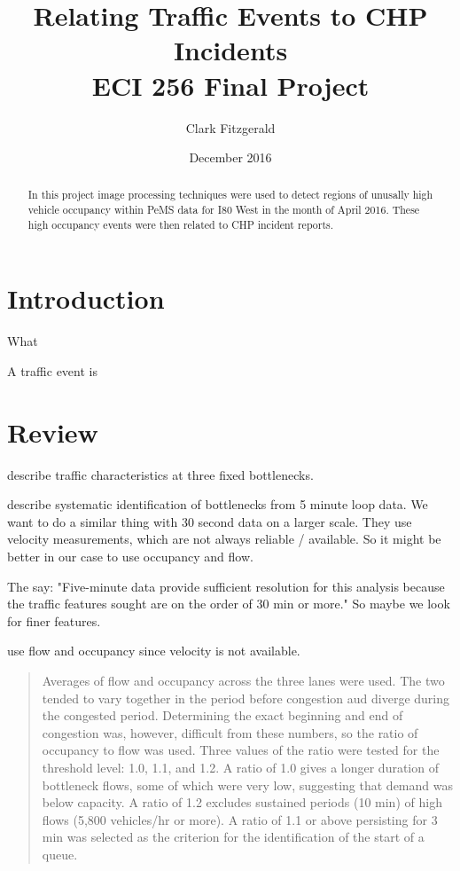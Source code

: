 \documentclass[12pt]{article}
\begin{document}
\title{Relating Traffic Events to CHP Incidents\\
ECI 256 Final Project}
\date{December 2016}
\author{Clark Fitzgerald}
\maketitle

\begin{abstract}

In this project image processing techniques were used to detect regions of
    unusally high vehicle occupancy 
within PeMS data for I80 West in the month of April 2016. 
These high occupancy events were then related to CHP incident reports.

\end{abstract}

\section{Introduction}

What 

A traffic event is 

\section{Review}

\cite{chung2007relation} describe traffic characteristics at three fixed bottlenecks.

\cite{chen2004systematic} describe systematic identification of bottlenecks from 5
minute loop data. We want to do a similar thing with 30 second data on a larger scale.
They use velocity measurements, which are not always reliable / available. So it might be 
better in our case to use occupancy and flow.

The say: "Five-minute data provide sufficient
resolution for this analysis because the traffic features sought are on
the order of 30 min or more." So maybe we look for finer features.

\cite{hall1991freeway} use flow and occupancy since velocity is not available.

\begin{quote}
Averages of flow and occupancy across the three lanes were
used. The two tended to vary together in the period before
congestion aud diverge during the congested period. Determining
the exact beginning and end of congestion was,
however, difficult from these numbers, so the ratio of occupancy
to flow was used. Three values of the ratio were tested
for the threshold level: 1.0, 1.1, and 1.2. A ratio of 1.0 gives
a longer duration of bottleneck flows, some of which were
very low, suggesting that demand was below capacity. A ratio
of 1.2 excludes sustained periods (10 min) of high flows (5,800
vehicles/hr or more). A ratio of 1.1 or above persisting for 3
min was selected as the criterion for the identification of the
start of a queue. 
\end{quote}
\end{document}
